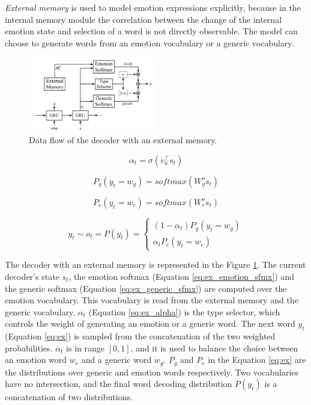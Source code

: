 \textit{External memory} is used to model emotion expressions explicitly, because in the internal memory module the correlation between the change of the internal emotion state and selection of a word is not directly observable. The model can choose to generate words from  an emotion vocabulary or a generic vocabulary.

\begin{figure}[H]
  \centering
  \includegraphics[width=0.5\textwidth]{figures/external_memory.png}
  \caption{Data flow of the decoder with an external memory.}
  \label{fig:external_memory}
\end{figure}

\begin{equation} \label{eq:ex_alpha}
\alpha_t = \sigma(v_u^\intercal s_t)
\end{equation}

\begin{equation} \label{eq:ex_emotion_sfmx}
P_g(y_t = w_g) = softmax(W_g^o s_t)
\end{equation}

\begin{equation} \label{eq:ex_generic_sfmx}
P_e(y_t = w_e) = softmax(W_e^o s_t)
\end{equation}

\begin{equation}\label{eq:ex}
y_t \sim o_t = P(y_t) = \begin{cases} (1-\alpha_t)P_g(y_t = w_g) \\ \alpha_tP_e(y_t = w_e) \end{cases}
\end{equation}

The decoder with an external memory is represented in the Figure \ref{fig:external_memory}. The current decoder's state $s_t$, the emotion softmax (Equation \ref{eq:ex_emotion_sfmx}) and the generic softmax (Equation \ref{eq:ex_generic_sfmx}) are computed over the emotion vocabulary. This vocabulary is read from the external memory and the generic vocabulary. $\alpha_t$ (Equation \ref{eq:ex_alpha}) is the type selector, which controls the weight of generating an emotion or a generic word. The next word $y_t$ (Equation \ref{eq:ex}) is sampled from the concatenation of the two weighted probabilities. $\alpha_t$ is in range $[0,1]$, and it is used to balance the choice between an emotion word $w_e$ and a generic word $w_g$. $P_g$ and $P_e$ in the Equation \ref{eq:ex} are the distributions over generic and emotion words respectively. Two vocabularies have no intersection, and the final word decoding distribution $P(y_t)$ is a concatenation of two distributions.

